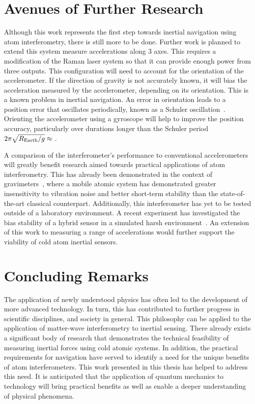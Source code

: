 \section{Avenues of Further Research}
Although this work represents the first step towards inertial
navigation using atom interferometry, there is still more to be done.
Further work is planned to extend this system measure accelerations
along 3 axes. This requires a modification of the Raman laser system so
that it can provide enough power from three outputs. This
configuration will need to account for the orientation of the
accelerometer. If the
direction of gravity is not accurately known, it will bias the
acceleration measured by the accelerometer, depending on its
orientation. This is a known problem in inertial navigation. An error
in orientation leads to a
position error that oscillates periodically, known as a Schuler
oscillation~\cite{Schuler1923}. Orienting the accelerometer using a
gyroscope will help to improve the position accuracy, particularly over
durations longer than the Schuler period $2\pi
\sqrt{R_\textnormal{Earth}/g} \approx$
. 
\par\noindent
A comparison of the interferometer's performance to conventional
accelerometers will greatly benefit research aimed towards
practical applications of atom interferometry. This has already been
demonstrated in the context of gravimeters~\cite{Farah2014,Gillot2014}, where a
mobile atomic system has demonstrated greater insensitivity to
vibration noise and better short-term stability than the
state-of-the-art classical counterpart. Additionally, this interferometer has
yet to be tested outside of a laboratory environment. A recent
experiment has investigated the bias stability of a hybrid sensor in a
simulated harsh environment~\cite{Cheiney2018}. An extension of this
work to measuring a range of accelerations would further
support the viability of cold atom inertial sensors.  
\section{Concluding Remarks}
The application of newly understood physics has often led to the
development of more advanced technology. In turn, this has contributed
to further progress in scientific disciplines, and society in general.
This philosophy can be applied to the application of matter-wave
interferometry to inertial sensing. There already exists a significant
body of research that demonstrates the technical feasibility of
measuring inertial forces using cold atomic systems. In addition, the
practical requirements for navigation have served to identify a need
for the unique benefits of atom interferometers. This work presented
in this thesis has helped to address this need. It is anticipated that
the application of quantum mechanics to technology will
bring practical benefits as well as enable a deeper understanding of
physical phenomena.
